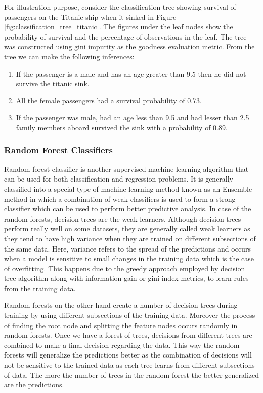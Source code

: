 \documentclass[11pt,openright]{report}
\begin{document}
For illustration purpose, consider the classification tree showing survival of passengers on the Titanic ship when it sinked in Figure \ref{fig:classification_tree_titanic}. The figures under the leaf nodes show the probability of survival and the percentage of observations in the leaf. The tree was constructed using gini impurity as the goodness evaluation metric. From the tree we can make the following inferences: 
\begin{enumerate}
  \item If the passenger is a male and has an age greater than 9.5 then he did not survive the titanic sink.
  \item All the female passengers had a survival probability of 0.73.
  \item If the passenger was male, had an age less than 9.5 and had lesser than 2.5 family members aboard survived the sink with a probability of 0.89.
\end{enumerate}


\subsubsection {Random Forest Classifiers}
Random forest classifier is another supervised machine learning algorithm that can be used for both classification and regression problems. It is generally classified into a special type of machine learning method known as an Ensemble method in which a combination of weak classifiers is used to form a strong classifier which can be used to perform better predictive analysis. In case of the random forests, decision trees are the weak learners.  Although decision trees perform really well on some datasets, they are generally called weak learners as they tend to have high variance when they are trained on different subsections of the same data. Here, variance refers to the spread of the predictions and occurs when a model is sensitive to small changes in the training data which is the case of overfitting. This happens due to the greedy approach employed by decision tree algorithm along with information gain or gini index metrics, to learn rules from the training data.


Random forests on the other hand create a number of decision trees during training by using different subsections of the training data.  Moreover the process of finding the root node and splitting the feature nodes occurs randomly in random forests. Once we have a forest of trees, decisions from different trees are combined to make a final decision regarding the data. This way the random forests will generalize the predictions better as the combination of decisions will not be sensitive to the trained data as each tree learns from different subsections of data. The more the number of trees in the random forest the better generalized are the predictions.
\end{document}
